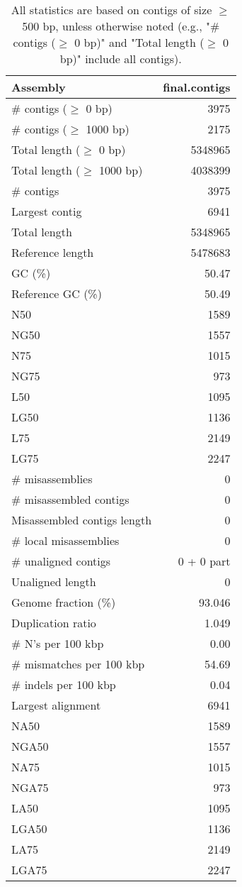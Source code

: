 \documentclass[12pt,a4paper]{article}
\begin{document}
\begin{table}[ht]
\begin{center}
\caption{All statistics are based on contigs of size $\geq$ 500 bp, unless otherwise noted (e.g., "\# contigs ($\geq$ 0 bp)" and "Total length ($\geq$ 0 bp)" include all contigs).}
\begin{tabular}{|l*{1}{|r}|}
\hline
Assembly & final.contigs \\ \hline
\# contigs ($\geq$ 0 bp) & 3975 \\ \hline
\# contigs ($\geq$ 1000 bp) & 2175 \\ \hline
Total length ($\geq$ 0 bp) & 5348965 \\ \hline
Total length ($\geq$ 1000 bp) & 4038399 \\ \hline
\# contigs & 3975 \\ \hline
Largest contig & 6941 \\ \hline
Total length & 5348965 \\ \hline
Reference length & 5478683 \\ \hline
GC (\%) & 50.47 \\ \hline
Reference GC (\%) & 50.49 \\ \hline
N50 & 1589 \\ \hline
NG50 & 1557 \\ \hline
N75 & 1015 \\ \hline
NG75 & 973 \\ \hline
L50 & 1095 \\ \hline
LG50 & 1136 \\ \hline
L75 & 2149 \\ \hline
LG75 & 2247 \\ \hline
\# misassemblies & 0 \\ \hline
\# misassembled contigs & 0 \\ \hline
Misassembled contigs length & 0 \\ \hline
\# local misassemblies & 0 \\ \hline
\# unaligned contigs & 0 + 0 part \\ \hline
Unaligned length & 0 \\ \hline
Genome fraction (\%) & 93.046 \\ \hline
Duplication ratio & 1.049 \\ \hline
\# N's per 100 kbp & 0.00 \\ \hline
\# mismatches per 100 kbp & 54.69 \\ \hline
\# indels per 100 kbp & 0.04 \\ \hline
Largest alignment & 6941 \\ \hline
NA50 & 1589 \\ \hline
NGA50 & 1557 \\ \hline
NA75 & 1015 \\ \hline
NGA75 & 973 \\ \hline
LA50 & 1095 \\ \hline
LGA50 & 1136 \\ \hline
LA75 & 2149 \\ \hline
LGA75 & 2247 \\ \hline
\end{tabular}
\end{center}
\end{table}
\end{document}
